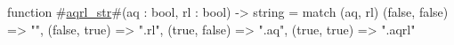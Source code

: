 function #\hyperref[sailRISCVzaqrlzystr]{aqrl\_str}#(aq : bool, rl : bool) -> string =
  match (aq, rl) {
    (false, false) => "",
    (false, true)  => ".rl",
    (true, false)  => ".aq",
    (true, true)   => ".aqrl"
  }
